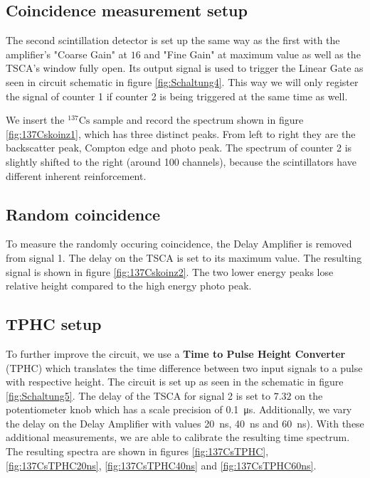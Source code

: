 \subsection{Coincidence measurement setup}
%
The second scintillation detector is set up the same way as the first with the amplifier's "Coarse Gain" at $16$ and "Fine Gain" at maximum value as well as the TSCA's window fully open.
Its output signal is used to trigger the Linear Gate as seen in circuit schematic in figure \ref{fig:Schaltung4}.
This way we will only register the signal of counter 1 if counter 2 is being triggered at the same time as well.
%
\par
%
We insert the $^{137}\text{Cs}$ sample and record the spectrum shown in figure \ref{fig:137Cskoinz1}, which has three distinct peaks.
From left to right they are the backscatter peak, Compton edge and photo peak.
The spectrum of counter 2 is slightly shifted to the right (around 100 channels), because the scintillators have different inherent reinforcement.
%
\subsection{Random coincidence}
%
To measure the randomly occuring coincidence, the Delay Amplifier is removed from signal 1.
The delay on the TSCA is set to its maximum value.
The resulting signal is shown in figure \ref{fig:137Cskoinz2}.
The two lower energy peaks lose relative height compared to the high energy photo peak.
%
\subsection{TPHC setup}
%
To further improve the circuit, we use a \textbf{Time to Pulse Height Converter} (TPHC) which translates the time difference between two input signals to a pulse with respective height.
The circuit is set up as seen in the schematic in figure \ref{fig:Schaltung5}.
The delay of the TSCA for signal 2 is set to $7.32$ on the potentiometer knob which has a scale precision of \SI{0.1}{\micro\second}.
Additionally, we vary the delay on the Delay Amplifier with values \SI{20}{\nano\second}, \SI{40}{\nano\second} and \SI{60}{\nano\second}).
With these additional measurements, we are able to calibrate the resulting time spectrum.
The resulting spectra are shown in figures \ref{fig:137CsTPHC}, \ref{fig:137CsTPHC20ns}, \ref{fig:137CsTPHC40ns} and \ref{fig:137CsTPHC60ns}.
%
